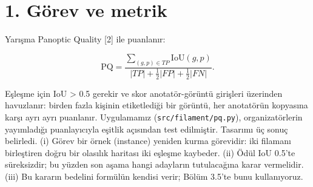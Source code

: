 
\begin{abstract}
İki nihai gönderimimizin arkasındaki sistemi anlatıyoruz. Tam-disk GONG H-alfa
görüntüsünde filaman örneklerini iki bağımsız hat önerir: 1792 px'te bir YOLO11m-seg dedektörü ve
1536 px'te on iki üyeli bir U-Net (EfficientNet-B3) semantik topluluğu. Adaylar güven ağırlıklı
oylamayla füzyonlanır, 42 öznitelikle tanımlanır ve torbalanmış, iki aşamalı, gradyan-artırmalı bir
seçici tarafından tutulur ya da atılır; seçicinin tutma eşiği ayarlanmamış, Panoptic Quality
formülünden türetilmiştir. Sistem 707 eğitim görüntüsünün tamamında kat-dışı olarak PQ 0.443
(SQ 0.678, RQ 0.653) değerine ulaşır; diğer anotatörlere karşı puanlanan tek bir anotatör 0.340
alır; açık liderlik tablosu 0.40 gösterir. Her parametreyi, doğrulama protokolünü, Dice, IoU ve
ilişki dağılımlarını, barb'lar dahil tahminlerin morfolojisini ve ölçülmüş olumsuz sonuçları
raporluyoruz. Depo, gönderilen iki dosyayı da bayt bayt yeniden üretir.
\end{abstract}

\section{1. Görev ve metrik}\label{guxf6rev-ve-metrik}

Yarışma Panoptic Quality {[}2{]} ile puanlanır:

\[\mathrm{PQ}=\frac{\sum_{(g,p)\in TP}\mathrm{IoU}(g,p)}{|TP|+\tfrac12|FP|+\tfrac12|FN|}.\]

Eşleşme için IoU \textgreater{} 0.5 gerekir ve skor anotatör-görüntü girişleri üzerinden havuzlanır: birden
fazla kişinin etiketlediği bir görüntü, her anotatörün kopyasına karşı ayrı ayrı puanlanır.
Uygulamamız (\texttt{src/filament/pq.py}), organizatörlerin yayımladığı puanlayıcıyla eşitlik açısından
test edilmiştir. Tasarımı üç sonuç belirledi. (i) Görev bir örnek (instance) yeniden kurma
görevidir: iki filamanı birleştiren doğru bir olasılık haritası iki eşleşme kaybeder. (ii) Ödül
IoU 0.5'te süreksizdir; bu yüzden son aşama hangi adayların tutulacağına karar vermelidir.
(iii) Bu kararın bedelini formülün kendisi verir; Bölüm 3.5'te bunu kullanıyoruz.

